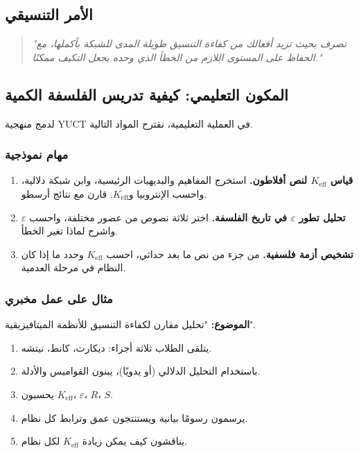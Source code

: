 \documentclass[11pt,a4paper]{article}
\newcommand{\eps}{\varepsilon}
\begin{document}
	\subsection{الأمر التنسيقي}
	
	\begin{quote}
		\textit{"تصرف بحيث تزيد أفعالك من كفاءة التنسيق طويلة المدى للشبكة بأكملها، مع الحفاظ على المستوى اللازم من الخطأ الذي وحده يجعل التكيف ممكنًا."}
	\end{quote}
	
	\subsection{المكون التعليمي: كيفية تدريس الفلسفة الكمية}
	\label{sec:educational}
	
	لدمج منهجية YUCT في العملية التعليمية، نقترح المواد التالية.
	
	\subsubsection{مهام نموذجية}
	
	\begin{enumerate}[label=(\arabic*)]
		\item \textbf{قياس \(K_{\mathrm{eff}}\) لنص أفلاطون.} استخرج المفاهيم والبديهيات الرئيسية، وابن شبكة دلالية، واحسب الإنتروبيا و\(K_{\mathrm{eff}}\). قارن مع نتائج أرسطو.
		\item \textbf{تحليل تطور \(\eps\) في تاريخ الفلسفة.} اختر ثلاثة نصوص من عصور مختلفة، واحسب \(\eps\) واشرح لماذا تغير الخطأ.
		\item \textbf{تشخيص أزمة فلسفية.} من جزء من نص ما بعد حداثي، احسب \(K_{\mathrm{eff}}\) وحدد ما إذا كان النظام في مرحلة العدمية.
	\end{enumerate}
	
	\subsubsection{مثال على عمل مخبري}
	
	\textbf{الموضوع:} "تحليل مقارن لكفاءة التنسيق للأنظمة الميتافيزيقية".
	
	\begin{enumerate}
		\item يتلقى الطلاب ثلاثة أجزاء: ديكارت، كانط، نيتشه.
		\item باستخدام التحليل الدلالي (أو يدويًا)، يبنون القواميس والأدلة.
		\item يحسبون \(K_{\mathrm{eff}}\)، \(\eps\)، \(R\)، \(S\).
		\item يرسمون رسومًا بيانية ويستنتجون عمق وترابط كل نظام.
		\item يناقشون كيف يمكن زيادة \(K_{\mathrm{eff}}\) لكل نظام.
	\end{enumerate}
	
\end{document}

